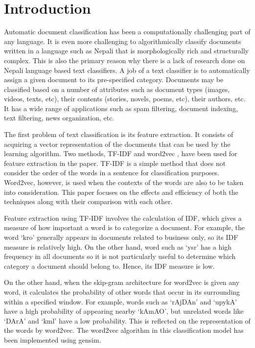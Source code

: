 \documentclass[fleqn --11pt --twoside]{IOEGC2016} %
\begin{document}
\section*{Introduction}
Automatic document classification has been a computationally challenging part of any language. It is even more challenging to algorithmically classify documents written in a language such as Nepali that is morphologically rich and structurally complex. This is also the primary reason why there is a lack of research done on Nepali language based text classifiers. A job of a text classifier is to automatically assign a given document to its pre-specified category. Documents may be classified based on a number of attributes such as document types (images, videos, texts, etc), their contents (stories, novels, poems, etc), their authors, etc. It has a wide range of applications such as spam filtering, document indexing, text filtering, news organization, etc. 
\par
The first problem of text classification is its feature extraction. It consists of acquiring a vector representation of the documents that can be used by the learning algorithm. Two methods, TF-IDF and word2vec \cite{mikolov2013distributed}, have been used for feature extraction in the paper. TF-IDF is a simple method that does not consider the order of the words in a sentence for classification purposes. Word2vec, however, is used when the contexts of the words are also to be taken into consideration. This paper focuses on the effects and efficiency of both the techniques along with their comparison with each other.
\par
Feature extraction using TF-IDF involves the calculation of IDF, which gives a measure of how important a word is to categorize a document. For example, the word `{\dn kro}' generally appears in documents related to business only, so its IDF measure is relatively high. On the other hand, word such as `{\dn ysr}' has a high frequency in all documents so it is not particularly useful to determine which category a document should belong to. Hence, its IDF measure is low. 
\par
On the other hand, when the skip-gram architecture for word2vec is given any word, it calculates the probability of other words that occur in its surrounding within a specified window. For example, words such as `{\dn rAjDAn}' and `{\dn upykA}' have a high probability of appearing nearby `{\dn kAmAO}', but unrelated words like `{\dn DArA}' and `{\dn kml}' have a low probability. This is reflected on the representation of the words by word2vec. The word2vec algorithm in this classification model has been implemented using gensim.\cite{rehurek_lrec}
\end{document}

